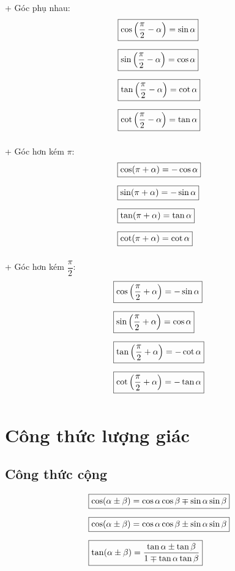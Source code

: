 + Góc phụ nhau:
\[
    \begin{aligned}
        &\fbox{$\cos\left(\dfrac{\pi}{2}-\alpha\right)=\sin\alpha$}\\[6pt]
        &\fbox{$\sin\left(\dfrac{\pi}{2}-\alpha\right)=\cos\alpha$}\\[6pt]
        &\fbox{$\tan\left(\dfrac{\pi}{2}-\alpha\right)=\cot\alpha$}\\[6pt]
        &\fbox{$\cot\left(\dfrac{\pi}{2}-\alpha\right)=\tan\alpha$}\\[6pt]
    \end{aligned}
\]

+ Góc hơn kém $\pi$:
\[
    \begin{aligned}
        &\fbox{$\cos(\pi+\alpha)=-\cos\alpha$}\\[6pt]
        &\fbox{$\sin(\pi+\alpha)=-\sin\alpha$}\\[6pt]
        &\fbox{$\tan(\pi+\alpha)=\tan\alpha$}\\[6pt]
        &\fbox{$\cot(\pi+\alpha)=\cot\alpha$}\\[6pt]
    \end{aligned}
\]

+ Góc hơn kém $\dfrac{\pi}{2}$:
\[
    \begin{aligned}
        &\fbox{$\cos\left(\dfrac{\pi}{2}+\alpha\right)=-\sin\alpha$}\\[6pt]
        &\fbox{$\sin\left(\dfrac{\pi}{2}+\alpha\right)=\cos\alpha$}\\[6pt]
        &\fbox{$\tan\left(\dfrac{\pi}{2}+\alpha\right)=-\cot\alpha$}\\[6pt]
        &\fbox{$\cot\left(\dfrac{\pi}{2}+\alpha\right)=-\tan\alpha$}\\[6pt]
    \end{aligned}
\]

\section{Công thức lượng giác}

\subsection{Công thức cộng}
\[
    \begin{aligned}
        &\fbox{$\cos(\alpha\pm\beta)=\cos\alpha\cos\beta\mp\sin\alpha\sin\beta$}\\[6pt]
        &\fbox{$\cos(\alpha\pm\beta)=\cos\alpha\cos\beta\pm\sin\alpha\sin\beta$}\\[6pt]
        &\fbox{$\tan(\alpha\pm\beta)=\dfrac{\tan\alpha\pm\tan\beta}{1\mp\tan\alpha\tan\beta}$}
    \end{aligned}
\]

